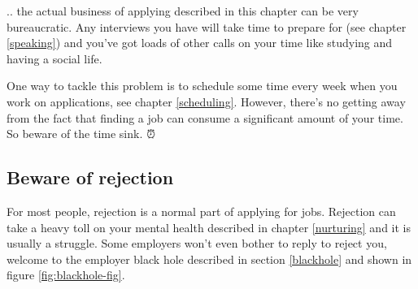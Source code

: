 \documentclass[
]{book}
\begin{document}
.. the actual business of applying described in this chapter can be very bureaucratic. Any interviews you have will take time to prepare for (see chapter \ref{speaking}) and you've got loads of other calls on your time like studying and having a social life.

One way to tackle this problem is to schedule some time every week when you work on applications, see chapter \ref{scheduling}. However, there's no getting away from the fact that finding a job can consume a significant amount of your time. So beware of the time sink. ⏰

\hypertarget{rejection}{%
\subsection{Beware of rejection}\label{rejection}}

For most people, rejection is a normal part of applying for jobs. Rejection can take a heavy toll on your mental health described in chapter \ref{nurturing} and it is usually a struggle. Some employers won't even bother to reply to reject you, welcome to the employer black hole described in section \ref{blackhole} and shown in figure \ref{fig:blackhole-fig}.
\end{document}
